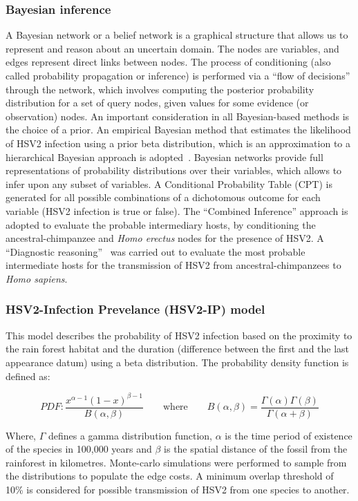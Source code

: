 \documentclass[fleqn,10pt]{wlscirep}
\begin{document}
\subsubsection*{Bayesian inference}
A Bayesian network or a belief network is a graphical structure that allows us to represent and reason about an uncertain domain. The nodes are variables, and edges represent direct links between nodes. The process of conditioning (also called probability propagation or inference) is performed via a ``flow of decisions'' through the network, which involves computing the posterior probability distribution for a set of query nodes, given values for some evidence (or observation) nodes. An important consideration in all Bayesian-based methods is the choice of a prior. An empirical Bayesian method that estimates the likelihood of HSV2 infection using a prior beta distribution, which is an approximation to a hierarchical Bayesian approach is adopted~\cite{Murphy2012,Farine2015}. Bayesian networks provide full representations of probability distributions over their variables, which allows to infer upon any subset of variables. A Conditional Probability Table (CPT) is generated for all possible combinations of a dichotomous outcome for each variable (HSV2 infection is true or false). The ``Combined Inference'' approach is adopted to evaluate the probable intermediary hosts, by conditioning the ancestral-chimpanzee and \textit{Homo erectus} nodes for the presence of HSV2. A ``Diagnostic reasoning''~\cite{Korb2003} was carried out to evaluate the most probable intermediate hosts for the transmission of HSV2 from ancestral-chimpanzees to \textit{Homo sapiens}. 

\subsubsection*{HSV2-Infection Prevelance (HSV2-IP) model}
This model describes the probability of HSV2 infection based on the proximity to the rain forest habitat and the duration (difference between the first and the last appearance datum)  using a beta distribution. The probability density function is defined as:

\begin{equation}
PDF: \frac{x^{\alpha - 1}(1 - x)^{\beta - 1}}{B(\alpha, \beta)} \qquad \mathrm{where} \qquad B(\alpha, \beta) = \frac{\Gamma(\alpha)\Gamma(\beta)}{\Gamma(\alpha + \beta)}
\end{equation}

Where, $\Gamma$ defines a gamma distribution function, $\alpha$ is the time period of existence of the species in 100,000 years and $\beta$ is the spatial distance of the fossil from the rainforest in kilometres. Monte-carlo simulations were performed to sample from the distributions to populate the edge costs. A minimum overlap threshold of 10\% is considered for possible transmission of HSV2 from one species to another. 
\end{document}
